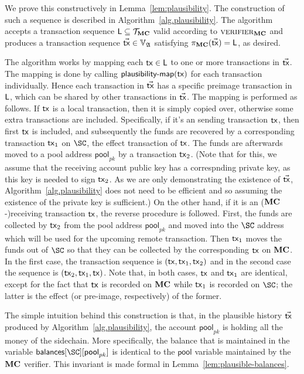 We prove this constructively in Lemma~\ref{lem:plausibility}. The construction
of such a sequence
is described in Algorithm~\ref{alg.plausibility}. The algorithm accepts a
transaction sequence $\mathsf{L} \subseteq \mathcal{T}_{\mathbf{MC}}$
valid according to
$\textsc{verifier}_{\mathbf{MC}}$ and produces a transaction sequence $\vec{\mathsf{tx}} \in
\mathbb{V}_{\mathfrak{A}}$ satisfying
$\pi_{\mathbf{MC}}(\vec{\mathsf{tx}}) = \mathsf{L}$, as desired.

The algorithm works by mapping each $\mathsf{tx} \in \mathsf{L}$ to one or more transactions in
$\vec{\mathsf{tx}}$. The mapping is done by calling $\textsf{plausibility-map}(\mathsf{tx})$ for
each transaction individually. Hence each transaction in $\vec{\mathsf{tx}}$ has a
specific preimage transaction in $\mathsf{L}$, which can be shared by other transactions
in $\vec{\mathsf{tx}}$. The mapping is performed as follows. If $\mathsf{tx}$ is a local
transaction, then it is simply copied over, otherwise
some extra transactions are included. Specifically, if it's an
sending transaction $\mathsf{tx}$, then first $\mathsf{tx}$ is included, and
subsequently the funds are recovered by a corresponding transaction $\mathsf{tx}_1$ on
$\SC$, the effect transaction of $\mathsf{tx}$. The funds are afterwards moved to a
pool address $\textsf{pool}_{pk}$ by a transaction $\mathsf{tx}_2$.
(Note that for this, we assume that the receiving account public key has a
correspnding private key, as this key is needed to sign $\mathsf{tx}_2$. As we are only
demonstrating the existence of $\vec{\mathsf{tx}}$, Algorithm~\ref{alg.plausibility} does
not need to be efficient and so assuming the existence of the private key is
sufficient.)
On the other hand,
if it is an ($\mathbf{MC}$-)receiving transaction $\mathsf{tx}$, the reverse procedure is
followed. First, the funds are collected by $\mathsf{tx}_2$ from the pool address
$\textsf{pool}_{pk}$ and moved into the $\SC$ address which will be used for the
upcoming remote transaction. Then $\mathsf{tx}_1$ moves the funds out of $\SC$ so that
they can be collected by the corresponding $\mathsf{tx}$ on $\mathbf{MC}$. In the first case, the
transaction sequence is $(\mathsf{tx}, \mathsf{tx}_1, \mathsf{tx}_2)$ and in the second case the
sequence is $(\mathsf{tx}_2, \mathsf{tx}_1, \mathsf{tx})$. Note that, in both cases, $\mathsf{tx}$ and $\mathsf{tx}_1$
are identical, except for the fact that $\mathsf{tx}$ is recorded on $\mathbf{MC}$ while $\mathsf{tx}_1$
is recorded on $\SC$; the latter is the effect (or pre-image, respectively)
of the former.

The simple intuition behind this construction is that, in the plausible history
$\vec{\mathsf{tx}}$ produced by Algorithm~\ref{alg.plausibility}, the account $\textsf{pool}_{pk}$
is holding all the money of the sidechain. More specifically, the
balance that is maintained in the variable
$\textsf{balances}[\SC][\textsf{pool}_{pk}]$ is identical to the $\textsf{pool}$
variable maintained by the $\mathbf{MC}$ verifier. This invariant is made formal in
Lemma~\ref{lem:plausible-balances}.

